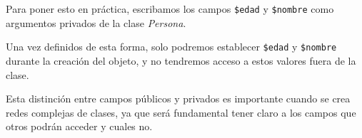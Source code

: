 \documentclass[
]{book}
\newenvironment{Shaded}{\begin{snugshade}}{\end{snugshade}}
\newcommand{\AttributeTok}[1]{\textcolor[rgb]{0.13,0.29,0.53}{#1}}
\newcommand{\ConstantTok}[1]{\textcolor[rgb]{0.56,0.35,0.01}{#1}}
\newcommand{\ControlFlowTok}[1]{\textcolor[rgb]{0.13,0.29,0.53}{\textbf{#1}}}
\newcommand{\DocumentationTok}[1]{\textcolor[rgb]{0.56,0.35,0.01}{\textbf{\textit{#1}}}}
\newcommand{\FunctionTok}[1]{\textcolor[rgb]{0.13,0.29,0.53}{\textbf{#1}}}
\newcommand{\NormalTok}[1]{#1}
\newcommand{\OtherTok}[1]{\textcolor[rgb]{0.56,0.35,0.01}{#1}}
\newcommand{\SpecialCharTok}[1]{\textcolor[rgb]{0.81,0.36,0.00}{\textbf{#1}}}
\newcommand{\StringTok}[1]{\textcolor[rgb]{0.31,0.60,0.02}{#1}}
\begin{document}
Para poner esto en práctica, escribamos los campos \texttt{\$edad} y \texttt{\$nombre} como argumentos privados de la clase \emph{Persona}.

Una vez definidos de esta forma, solo podremos establecer \texttt{\$edad} y \texttt{\$nombre} durante la creación del objeto, y no tendremos acceso a estos valores fuera de la clase.

\begin{Shaded}
\end{Shaded}

Esta distinción entre campos públicos y privados es importante cuando se crea redes complejas de clases, ya que será fundamental tener claro a los campos que otros podrán acceder y cuales no.
\end{document}
